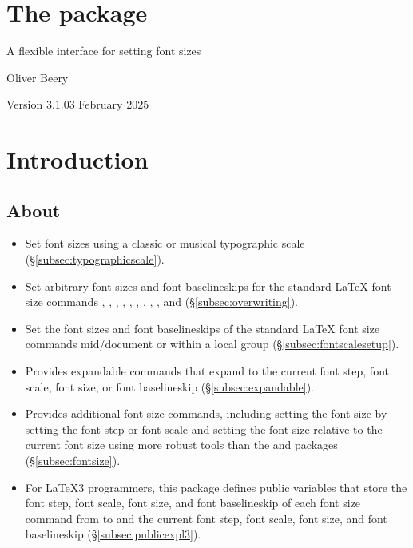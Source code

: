 \documentclass{beery}
\begin{document}
\section*
  {%
    The  package%
  }

A flexible interface for setting font sizes

Oliver Beery

Version 3.1.0\quad{}3 February 2025


\section{Introduction}
\label{sec:intro}

\subsection{About}
\label{subsec:about}

\begin{itemize}
  \item
  Set font sizes using a classic or musical typographic scale (\S\ref{subsec:typographicscale}).
  \item
  Set arbitrary font sizes and font baselineskips for the standard \LaTeX{} font size commands , , , , , , , , , and  (\S\ref{subsec:overwriting}).
  \item
  Set the font sizes and font baselineskips of the standard \LaTeX{} font size commands mid\-/document or within a local group (\S\ref{subsec:fontscalesetup}).
  \item
  Provides expandable commands that expand to the current font step, font scale, font size, or font baselineskip (\S\ref{subsec:expandable}).
  \item
  Provides additional font size commands, including setting the font size by setting the font step or font scale and setting the font size relative to the current font size using more robust tools than the  and  packages (\S\ref{subsec:fontsize}).
  \item
  For \LaTeX3 programmers, this package defines public  variables that store the font step, font scale, font size, and font baselineskip of each font size command from  to  and the current font step, font scale, font size, and font baselineskip (\S\ref{subsec:publicexpl3}).
\end{itemize}
\end{document}

